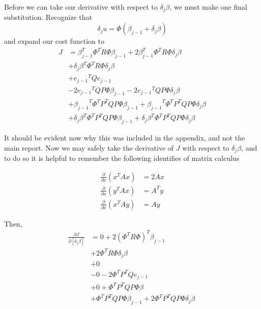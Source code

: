 Before we can take our derivative with respect to $\delta_j \beta$, we must make one final substitution. Recognize that
\begin{equation}
    \delta_j u = \Phi \left( \beta_{j-1} + \delta_j \beta \right)
\end{equation}
and expand our cost function to
\begin{equation}
    \begin{split}
        J &= {\beta_{j-1}^T}\Phi^T R \Phi \beta_{j-1} + 2{\beta_{j-1}^T}\Phi^T R \Phi \delta_j \beta \\
        &+ {\delta_j \beta}^T \Phi^T R \Phi \delta_j \beta \\
        &+ {e_{j-1}}^T Q e_{j-1} \\
        &- 2{e_{j-1}}^T Q P \Phi \beta_{j-1} - 2{e_{j-1}}^T Q P \Phi \delta_j \beta \\
        &+ {\beta_{j-1}}^T \Phi^T P^T Q P \Phi \beta_{j-1} + {\beta_{j-1}}^T \Phi^T P^T Q P \Phi \delta_j \beta \\
        &+ {\delta_j \beta}^T \Phi^T P^T Q P \Phi \beta_{j-1} + {\delta_j \beta}^T \Phi^T P^T Q P \Phi \delta_j \beta
    \end{split}
\end{equation}

It should be evident now why this was included in the appendix, and not the main report. Now we may safely take the derivative of $J$ with respect to $\delta_j \beta$, and to do so it is helpful to remember the following identifies of matrix calculus

\begin{align}
    \frac{\partial}{\partial x}\left(x^T A x\right) &= 2Ax \\
    \frac{\partial}{\partial x}\left(y^T A x\right) &= A^Ty \\
    \frac{\partial}{\partial x}\left(x^T A y\right) &= Ay 
\end{align}

Then, 
\begin{equation}
    \begin{split}
        \frac{\partial J}{\partial \left[\delta_j \beta \right]} &= 0 + 2{(\Phi^T R \Phi)}^T \beta_{j-1} \\
        &+ 2 \Phi^T R \Phi \delta_j \beta \\
        &+ 0 \\
        &- 0 - 2\Phi^T P^T Q e_{j-1} \\
        &+ 0 + \Phi^T P^T Q P \Phi \beta \\
        &+ \Phi^T P^T Q P \Phi \beta_{j-1} + 2 \Phi^T P^T Q P \Phi \delta_j \beta
    \end{split}
~\label{eq:cost_deriv_del_beta}
\end{equation}

